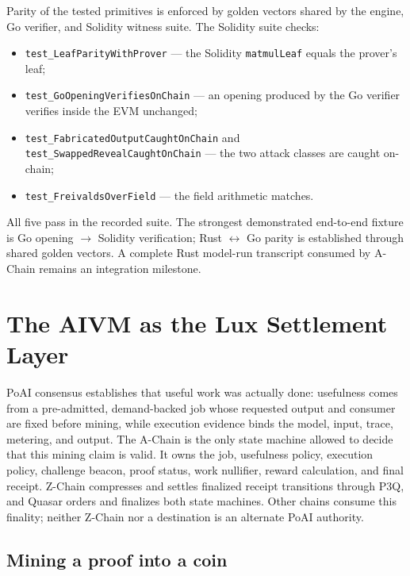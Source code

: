 \documentclass[11pt,a4paper]{article}
\begin{document}
Parity of the tested primitives is enforced by golden vectors shared by the engine, Go verifier, and Solidity witness suite. The Solidity suite checks:
\begin{itemize}
  \item \texttt{test\_LeafParityWithProver} --- the Solidity \texttt{matmulLeaf} equals the prover's leaf;
  \item \texttt{test\_GoOpeningVerifiesOnChain} --- an opening produced by the Go verifier verifies inside the EVM unchanged;
  \item \texttt{test\_FabricatedOutputCaughtOnChain} and \texttt{test\_SwappedRevealCaughtOnChain} --- the two attack classes are caught on-chain;
  \item \texttt{test\_FreivaldsOverField} --- the field arithmetic matches.
\end{itemize}
All five pass in the recorded suite. The strongest demonstrated end-to-end fixture is Go opening $\to$ Solidity verification; Rust $\leftrightarrow$ Go parity is established through shared golden vectors. A complete Rust model-run transcript consumed by A-Chain remains an integration milestone.

\section{The AIVM as the Lux Settlement Layer}\label{sec:settlement}

PoAI consensus establishes that useful work was actually done: usefulness comes from a pre-admitted, demand-backed job whose requested output and consumer are fixed before mining, while execution evidence binds the model, input, trace, metering, and output. The A-Chain is the only state machine allowed to decide that this mining claim is valid. It owns the job, usefulness policy, execution policy, challenge beacon, proof status, work nullifier, reward calculation, and final receipt. Z-Chain compresses and settles finalized receipt transitions through P3Q, and Quasar orders and finalizes both state machines. Other chains consume this finality; neither Z-Chain nor a destination is an alternate PoAI authority.

\subsection{Mining a proof into a coin}\label{sec:miner}
\end{document}
